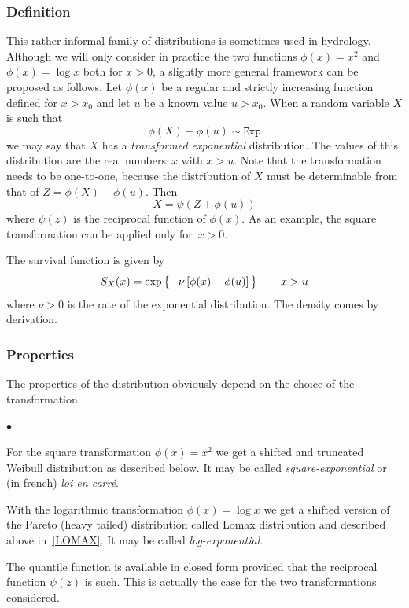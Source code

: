 \documentclass[a4paper]{report}
\begin{document}
\subsubsection*{Definition}
This rather informal family of distributions is sometimes used in hydrology.
Although we will only consider in practice the two functions 
$\phi(x) = x^2$ and $\phi(x) = \log x$ both for $x>0$,
a slightly more general framework can be proposed as follows. 
Let $\phi(x)$ be a regular and strictly increasing function
defined for $x > x_0$ and let $u$ be a known value $u > x_0$. When a random
variable
$X$ is such that
$$ 
   \phi(X) - \phi(u) \sim \texttt{Exp}
$$
we may say that $X$ has a \textit{transformed exponential} distribution. 
The values of this distribution are the real numbers~$x$ with $x>u$.
Note that the transformation needs to be one-to-one, because the distribution 
of $X$ must be determinable from that of $Z=\phi(X) - \phi(u)$. Then
$$ 
    X = \psi\left(Z + \phi(u)\right)
$$
where $\psi(z)$ is the reciprocal function of $\phi(x)$.
As an example, the square transformation can be applied only for~$x>0$.

The survival function is given by 
$$ 
   S_X(x) =  \exp\left\{-\nu \left[ \phi(x) - \phi(u) \right]\rule{0pt}{0.9em}\right\}
   \qquad x > u
$$
where $\nu>0$ is the rate of the exponential distribution. The density comes 
by derivation.

\subsubsection*{Properties}
The properties of the distribution obviously depend on the choice of the 
transformation. 
\begin{list}{$\bullet$}{ }
  \item For the square transformation $\phi(x) = x^2$ we get a 
    shifted and truncated Weibull distribution as described below. It
    may be called \textit{square-exponential} or (in french) \textit{loi en carr\'e}. 
  \item With  the logarithmic  transformation $\phi(x) = \log x$ we get a shifted version 
    of the Pareto (heavy tailed) distribution called Lomax distribution 
    and  described above in~\ref{LOMAX}. It
    may  be called \textit{log-exponential}. 
  \end{list}
The quantile function is available in closed form provided that the
reciprocal function $\psi(z)$ is such.  This is actually the 
case for the two transformations considered.
\end{document}
